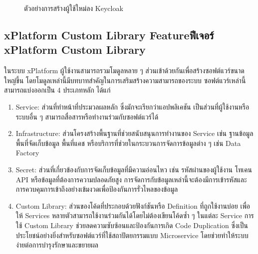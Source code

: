 \begin{figure}[ht]
\begin{center}
{
        } 
    \end{center}
    \caption[Example Keycloak Extension]{ตัวอย่างการสร้างผู้ใช้ใหม่ลง Keycloak}
    \label{fig:keycloak}
\end{figure}

\subsection{\ifenglish xPlatform Custom Library Feature\else ฟีเจอร์ xPlatform Custom Library \fi}
ในระบบ xPlatform ผู้ใช้งานสามารถรวมโมดูลหลาย ๆ ส่วนเข้าด้วยกันเพื่อสร้างซอฟต์แวร์ขนาดใหญ่ขึ้น โดยโมดูลเหล่านี้มีบทบาทสำคัญในการเสริมสร้างความสามารถของระบบ ซอฟต์แวร์เหล่านี้สามารถแบ่งออกเป็น 4 ประเภทหลัก ได้แก่
\begin{enumerate} 
    \item Service: ส่วนที่ทำหน้าที่ประมวลผลหลัก ซึ่งมักจะเรียกว่าแอปพลิเคชัน  เป็นส่วนที่ผู้ใช้งานหรือระบบอื่น ๆ สามารถสื่อสารหรือทำงานร่วมกับซอฟต์แวร์ได้
    \item Infrastructure: ส่วนโครงสร้างพื้นฐานที่ช่วยสนับสนุนการทำงานของ Service เช่น ฐานข้อมูล พื้นที่จัดเก็บข้อมูล พื้นที่แคช หรือบริการที่ช่วยในกระบวนการจัดการข้อมูลต่าง ๆ เช่น Data Factory
    \item Secret: ส่วนที่เกี่ยวข้องกับการจัดเก็บข้อมูลที่มีความอ่อนไหว เช่น รหัสผ่านของผู้ใช้งาน โทเคน API หรือข้อมูลที่ต้องการความปลอดภัยสูง การจัดการกับข้อมูลเหล่านี้จะต้องมีการเข้ารหัสและการควบคุมการเข้าถึงอย่างเข้มงวดเพื่อป้องกันการรั่วไหลของข้อมูล 
    \item Custom Library: ส่วนของโค้ดที่ประกอบด้วยฟังก์ชันหรือ Definition ที่ถูกใช้งานบ่อย เพื่อให้ Services หลายตัวสามารถใช้งานร่วมกันได้โดยไม่ต้องเขียนโค้ดซ้ำ ๆ ในแต่ละ Service การใช้ Custom Library ช่วยลดความซับซ้อนและป้องกันการเกิด Code Duplication ซึ่งเป็นประโยชน์อย่างยิ่งสำหรับซอฟต์แวร์ที่ใช้สถาปัตยกรรมแบบ Microservice โดยช่วยทำให้ระบบง่ายต่อการบำรุงรักษาและขยายผล 
\end{enumerate}

